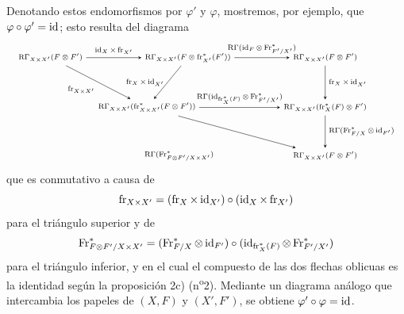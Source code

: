 Denotando estos endomorfismos por $\varphi'$ y $\varphi$, mostremos, por ejemplo, que $\varphi\circ\varphi'=\operatorname{id}$; esto resulta del diagrama
\[
\resizebox{\textwidth}{!}{%
\begin{tikzpicture}[baseline=(current bounding box.center),>=stealth,font=\scriptsize]
\node (A) at (0,3.6) {$\RGamma_{X\times X'}(F\otimes F')$};
\node (B) at (4.7,3.6) {$\RGamma_{X\times X'}(F\otimes\fr_{X'}^*(F'))$};
\node (C) at (9.4,3.6) {$\RGamma_{X\times X'}(F\otimes F')$};
\node (D) at (3.3,1.9) {$\RGamma_{X\times X'}(\fr^*_{X\times X'}(F\otimes F'))$};
\node (E) at (9.4,1.9) {$\RGamma_{X\times X'}(\fr_X^*(F)\otimes F')$};
\node (F) at (4.4,0.25) {$\RGamma(\Fr^*_{F\otimes F'/X\times X'})$};
\node (G) at (9.4,0.25) {$\RGamma_{X\times X'}(F\otimes F')$};
\draw[->] (A) -- node[above] {$\id_X\times\fr_{X'}$} (B);
\draw[->] (B) -- node[above] {$\RGamma(\id_F\otimes\Fr^*_{F'/X'})$} (C);
\draw[->] (A) -- node[below left] {$\fr_{X\times X'}$} (D);
\draw[->] (B) -- node[left] {$\fr_X\times\id_{X'}$} (D);
\draw[->] (C) -- node[right] {$\fr_X\times\id_{X'}$} (E);
\draw[->] (D) -- node[above] {$\RGamma(\id_{\fr_X^*(F)}\otimes\Fr^*_{F'/X'})$} (E);
\draw[->] (E) -- node[right] {$\RGamma(\Fr^*_{F/X}\otimes\id_{F'})$} (G);
\draw[->] (D) -- (G);
\end{tikzpicture}%
}
\]
que es conmutativo a causa de
\[
\operatorname{fr}_{X\times X'}=(\operatorname{fr}_X\times\operatorname{id}_{X'})\circ(\operatorname{id}_X\times\operatorname{fr}_{X'})
\]
para el triángulo superior y de
\[
\operatorname{Fr}^*_{F\otimes F'/X\times X'}=(\operatorname{Fr}^*_{F/X}\otimes\operatorname{id}_{F'})\circ(\operatorname{id}_{\operatorname{fr}_X^*(F)}\otimes\operatorname{Fr}^*_{F'/X'})
\]
para el triángulo inferior, y en el cual el compuesto de las dos flechas oblicuas es la identidad según la proposición 2c) (n\textsuperscript{o}2). Mediante un diagrama análogo que intercambia los papeles de $(X,F)$ y $(X',F')$, se obtiene $\varphi'\circ\varphi=\operatorname{id}$.
